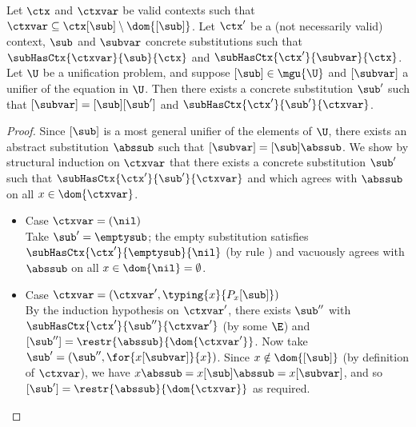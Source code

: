 \begin{lemma}
\label{lem:unification-mgu}
Let $\ctx$ and $\ctxvar$ be valid contexts such that $\ctxvar \subseteq \ctx[\sub] \setminus \dom{[\sub]}$.
Let $\ctx'$ be a (not necessarily valid) context, $\sub$ and $\subvar$ concrete substitutions such that $\subHasCtx{\ctxvar}{\sub}{\ctx}$ and $\subHasCtx{\ctx'}{\subvar}{\ctx}$.
Let $\U$ be a unification problem, and suppose $[\sub] \in \mgu{\U}$ and $[\subvar]$ a unifier of the equation in $\U$.
Then there exists a concrete substitution $\sub'$ such that $[\subvar] = [\sub][\sub']$ and $\subHasCtx{\ctx'}{\sub'}{\ctxvar}$.
\end{lemma}

\begin{proof}
Since $[\sub]$ is a most general unifier of the elements of $\U$, there exists an abstract substitution $\abssub$ such that $[\subvar] = [\sub] \abssub$.
We show by structural induction on $\ctxvar$ that there exists a concrete substitution $\sub'$ such that $\subHasCtx{\ctx'}{\sub'}{\ctxvar}$ and which agrees with $\abssub$ on all $x \in \dom{\ctxvar}$.
\begin{itemize}
	\item Case $\ctxvar = (\nil)$ \\
  Take $\sub' = \emptysub$; the empty substitution satisfies $\subHasCtx{\ctx'}{\emptysub}{\nil}$ (by rule ) and vacuously agrees with $\abssub$ on all $x \in \dom{\nil} = \emptyset$.
  \item Case $\ctxvar = (\ctxvar', \typing{x}{P_x[\sub]})$ \\
  By the induction hypothesis on $\ctxvar'$, there exists $\sub''$ with $\subHasCtx{\ctx'}{\sub''}{\ctxvar'}$ (by some $\E$) and $[\sub''] = \restr{\abssub}{\dom{\ctxvar'}}$.
  Now take $\sub' = (\sub'', \for{x[\subvar]}{x})$.
  Since $x \notin \dom{[\sub]}$ (by definition of $\ctxvar$), we have $x \abssub = x [\sub] \abssub = x[\subvar]$, and so $[\sub'] = \restr{\abssub}{\dom{\ctxvar}}$ as required.
  

\end{itemize}
\end{proof}
